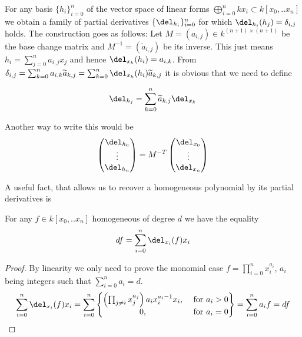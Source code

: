 \begin{example} \label{exampleAlternativePartialDerivatives}
For any basis $\{ h_i\}_{i=0}^n$ of the vector space of linear forms $\bigoplus_{i=0}^n kx_i \subset k[x_0,..x_n]$ we obtain a family of partial derivatives $\{ \del_{h_i} \}_{i=0}^n$ for which $\del_{h_i}(h_j) = \delta_{i,j}$ holds. The construction goes as follows: Let $M = (a_{i,j})  \in k^{(n+1)\times(n+1)}$ be the base change matrix and $M^{-1} = (\widetilde a_{i,j})$ be its inverse.
This just means $h_i = \sum_{j=0}^n a_{i,j} x_j$ and hence $\del_{x_k}(h_i) = a_{i,k}$.
From $\delta_{i,j} = \sum_{k=0}^n a_{i,k}\widetilde a_{k,j}
= \sum_{k=0}^n \del_{x_k}(h_i) \widetilde a_{k,j}$ it is obvious that we need to define

\begin{equation}
\del_{h_j} = \sum_{k=0}^n \widetilde a_{k,j} \del_{x_k}
\end{equation}

Another way to write this would be
\begin{equation}
\begin{pmatrix} \del_{h_0} \\ \vdots \\ \del_{h_n} \end{pmatrix}
= M^{-T}
\begin{pmatrix} \del_{x_0} \\ \vdots \\ \del_{x_n} \end{pmatrix}
\end{equation}
\end{example}

A useful fact, that allows us to recover a homogeneous polynomial by its partial derivatives is

\begin{proposition}
For any $f \in k[x_0,..x_n]$ homogeneous of degree $d$ we have the equality
\[ df = \sum_{i=0}^n \del_{x_i}(f)x_i \]
\end{proposition}
\begin{proof}
By linearity we only need to prove the monomial case $f = \prod_{i=0}^n x_i^{a_i}$, $a_i$ being integers such that $\sum_{i=0}^n a_i = d$.
\begin{equation}
\sum_{i=0}^n \del_{x_i}(f)x_i
= \sum_{i=0}^n \begin{Bmatrix} \left(\prod_{j\neq i} x_j^{a_j}\right) a_i x_i^{a_i-1} x_i, & \text{ for } a_i > 0
\\ 0, &\text{ for } a_i = 0 \end{Bmatrix}
= \sum_{i=0}^n a_i f = df
\end{equation}
\end{proof}

